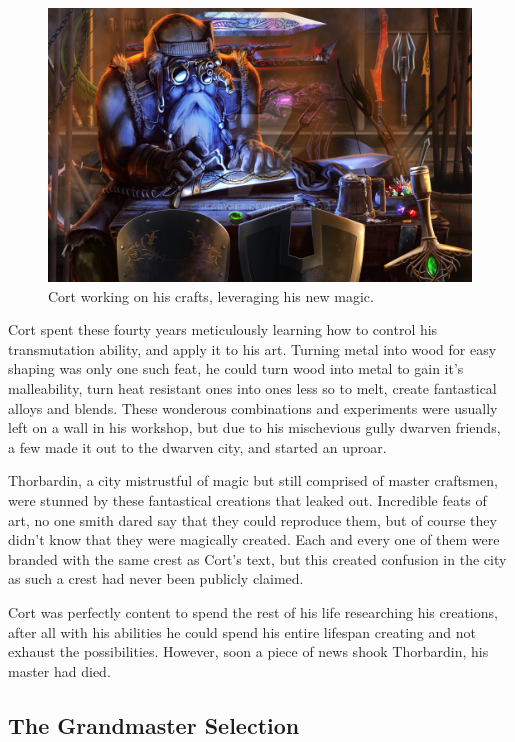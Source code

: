\documentclass[12pt]{article}
\begin{document}
\begin{figure}[!htb]
  \centering
  \includegraphics[width=\textwidth]{./resources/arcaneshaper}
  \caption{Cort working on his crafts, leveraging his new magic.}
\end{figure}

Cort spent these fourty years meticulously learning how to control his
transmutation ability, and apply it to his art. Turning metal into wood for easy
shaping was only one such feat, he could turn wood into metal to gain it's
malleability, turn heat resistant ones into ones less so to melt, create
fantastical alloys and blends. These wonderous combinations and experiments were
usually left on a wall in his workshop, but due to his mischevious gully dwarven
friends, a few made it out to the dwarven city, and started an uproar. 

Thorbardin, a city mistrustful of magic but still comprised of master craftsmen,
were stunned by these fantastical creations that leaked out. Incredible feats of
art, no one smith dared say that they could reproduce them, but of course they
didn't know that they were magically created. Each and every one of them were
branded with the same crest as Cort's text, but this created confusion in the
city as such a crest had never been publicly claimed.

Cort was perfectly content to spend the rest of his life researching his
creations, after all with his abilities he could spend his entire lifespan
creating and not exhaust the possibilities. However, soon a piece of news shook
Thorbardin, his master had died.

\subsection{The Grandmaster Selection}
\end{document}
